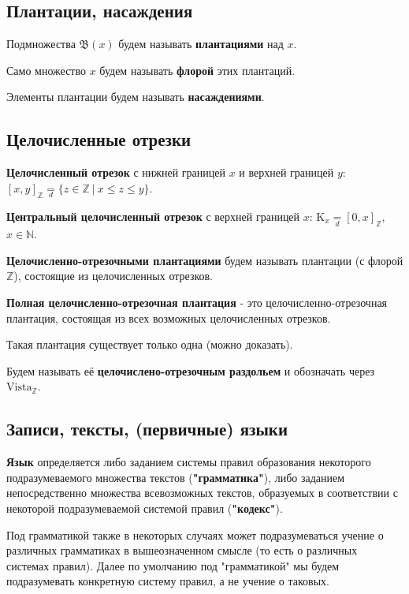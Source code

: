 \documentclass[a4paper]{article}
\begin{document}
\subsection{Плантации, насаждения}

Подмножества $\mathfrak{B}(x)$ будем называть \textbf{плантациями} над $x$.

Само множество $x$ будем называть \textbf{флорой} этих плантаций.

Элементы плантации будем называть \textbf{насаждениями}.

\subsection{Целочисленные отрезки}

\textbf{Целочисленный отрезок} с нижней границей $x$ и верхней границей $y$: $[x, y]_{\mathbb{Z}} \underset{d}{=} \{z \in \mathbb{Z} ~|~ x \leq z \leq y \}$.

\textbf{Центральный целочисленный отрезок} с верхней границей $x$: $\mathrm{K}_{x} \underset{d}{=} [0, x]_{\mathbb{Z}}$, $x \in \mathbb{N}$.

\textbf{Целочисленно-отрезочными плантациями} будем называть плантации (с флорой $\mathbb{Z}$), состоящие из целочисленных отрезков. 

\textbf{Полная целочисленно-отрезочная плантация} - это целочисленно-отрезочная плантация, состоящая из всех возможных целочисленных отрезков.

Такая плантация существует только одна (можно доказать).

Будем называть её \textbf{целочислено-отрезочным раздольем} и обозначать через $\mathrm{Vista}_{\mathbb{Z}}$.

\subsection{Записи, тексты, (первичные) языки}

\textbf{Язык} определяется либо заданием системы правил образования некоторого подразумеваемого множества текстов (\textbf{"грамматика"}), либо заданием непосредственно множества всевозможных текстов, образуемых в соответствии с некоторой подразумеваемой системой правил (\textbf{"кодекс"}).

Под грамматикой также в некоторых случаях может подразумеваться учение о различных грамматиках в вышеозначенном смысле (то есть о различных системах правил). Далее по умолчанию под "грамматикой" мы будем подразумевать конкретную систему правил, а не учение о таковых.
\end{document}
